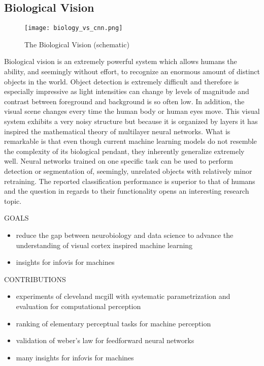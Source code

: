 \subsection{Biological Vision}

\begin{figure}[t]
	  \texttt{[image: biology\_vs\_cnn.png]}
  \caption{The Biological Vision (schematic)}
	\label{fig:vision}
\end{figure}

Biological vision is an extremely powerful system which allows humans the ability, and seemingly without effort, to recognize an enormous amount of distinct objects in the world. 
Object detection is extremely difficult and therefore is especially impressive as light intensities can change by levels of magnitude and contrast between foreground and background is so often low. 
In addition, the visual scene changes every time the human body or human eyes move. 
This visual system exhibits a very noisy structure but because it is organized by layers it has inspired the mathematical theory of multilayer neural networks. 
What is remarkable is that even though current machine learning models do not resemble the complexity of its biological pendant, they inherently generalize extremely well. 
Neural networks trained on one specific task can be used to perform detection or segmentation of, seemingly, unrelated objects with relatively minor retraining. 
The reported classification performance is superior to that of humans and the question in regards to their functionality opens an interesting research topic.


GOALS
\begin{itemize}
	\item reduce the gap between neurobiology and data science to advance the understanding of visual cortex inspired machine learning
	\item insights for infovis for machines
\end{itemize}

CONTRIBUTIONS
\begin{itemize}
	\item experiments of cleveland mcgill with systematic parametrization and evaluation for computational perception
	\item ranking of elementary perceptual tasks for machine perception
	\item validation of weber's law for feedforward neural networks
	\item many insights for infovis for machines
\end{itemize}


